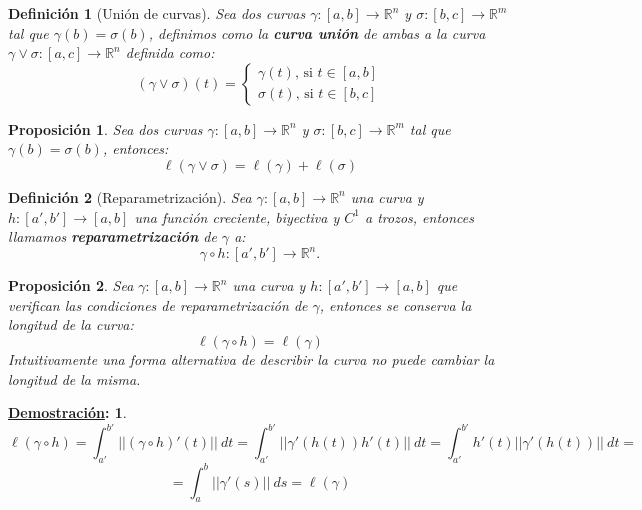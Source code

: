 \documentclass[10pt,a4paper,openright]{book}
\theoremstyle{break}
\newtheorem*{defi}{Definición}
\newtheorem*{prop}{Proposición}
\newtheorem*{demo}{\underline{Demostración}:}
\newcommand{\dif}[1]{\ d#1}
\begin{document}
\begin{defi}[Unión de curvas]
Sea dos curvas $\gamma : \left[ a, b \right] \rightarrow \mathbb{R}^n$ y $\sigma : \left[ b, c \right] \rightarrow \mathbb{R}^m$ tal que $\gamma\left( b \right) = \sigma \left( b \right)$, definimos como la \textbf{curva unión} de ambas a la curva $\gamma \lor \sigma: \left[ a, c \right] \rightarrow \mathbb{R}^n$ definida como:
$$\left( \gamma \lor \sigma \right) \left( t \right) = \begin{cases}
    \gamma\left( t \right) \text{, si } t \in \left[ a, b \right]\\
    \sigma\left( t \right) \text{, si } t \in \left[ b, c \right] 
\end{cases}$$
\end{defi}
\begin{prop}
Sea dos curvas $\gamma : \left[ a, b \right] \rightarrow \mathbb{R}^n$ y $\sigma : \left[ b, c \right] \rightarrow \mathbb{R}^m$ tal que $\gamma\left( b \right) = \sigma \left( b \right)$, entonces:
$$\ell \left( \gamma \lor \sigma \right) = \ell \left( \gamma \right) + \ell\left( \sigma \right) $$
\end{prop}

\begin{defi}[Reparametrización]
Sea $\gamma: \left[ a, b \right] \rightarrow \mathbb{R}^n$ una curva y $h: \left[ a', b' \right] \rightarrow \left[ a, b \right]$ una función creciente, biyectiva y $C^1$ a trozos, entonces llamamos \textbf{reparametrización} de $\gamma$ a:
$$\gamma \circ h: \left[ a', b' \right] \rightarrow \mathbb{R}^n.$$
\end{defi}

\begin{prop}
Sea $\gamma: \left[ a, b \right] \rightarrow \mathbb{R}^n$ una curva y $h: \left[ a', b' \right] \rightarrow \left[ a, b \right]$ que verifican las condiciones de reparametrización de $\gamma$, entonces se conserva la longitud de la curva: 
$$\ell \left( \gamma \circ h \right) = \ell \left( \gamma \right) $$
Intuitivamente una forma alternativa de describir la curva no puede cambiar la longitud de la misma.
\end{prop}
\begin{demo}
$$\ell \left( \gamma \circ h\right) = \int_{a'}^{b'} \lvert \lvert \left( \gamma \circ h \right)'\left( t \right) \rvert \rvert \dif{t} =  \int_{a'}^{b'} \lvert \lvert \gamma'\left( h\left( t \right) \right) h'\left( t \right) \rvert \rvert \dif{t} = \int_{a'}^{b'} h'\left( t \right) \lvert \lvert \gamma'\left( h\left( t \right) \right) \rvert \rvert \dif{t} = $$
$$= \int_{a}^{b} \lvert \lvert \gamma'\left( s \right) \rvert \rvert \dif{s} = \ell \left( \gamma \right) $$    
\end{demo}
\end{document}
